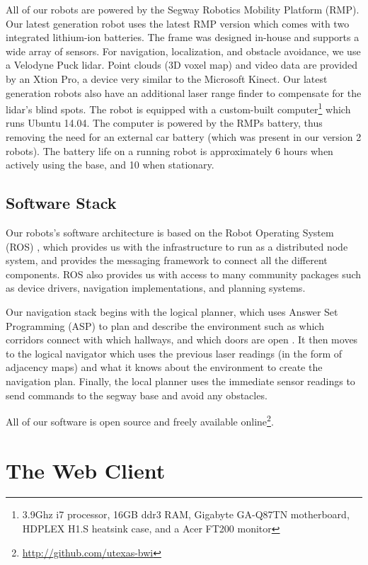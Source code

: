 \documentclass[
  oneside,
  11pt, a4paper,
  footinclude=true,
  headinclude=true,
  cleardoublepage=empty
]{article}
\begin{document}
All of our robots are powered by the Segway Robotics Mobility Platform (RMP).
Our latest generation robot uses the latest RMP version which comes with
two integrated lithium-ion batteries. The frame was designed in-house and
supports a wide array of sensors. For navigation, localization, and obstacle
avoidance, we use a Velodyne Puck lidar. Point clouds (3D voxel map) and video
data are provided by an Xtion Pro, a device very similar to the Microsoft
Kinect. Our latest generation robots also have an additional laser range finder
to compensate for the lidar's blind spots. The robot is equipped with a
custom-built computer\footnote{3.9Ghz i7 processor, 16GB ddr3 RAM, Gigabyte
GA-Q87TN motherboard, HDPLEX H1.S heatsink case, and a Acer FT200 monitor}
which runs Ubuntu 14.04. The computer is powered by the RMPs battery, thus
removing the need for an external car battery (which was present in our version
2 robots).  The battery life on a running robot is approximately 6 hours when
actively using the base, and 10 when stationary.

\subsection{Software Stack}

Our robots's software architecture is based on the Robot Operating System (ROS)
\citep{quigley2009}, which provides us with the infrastructure to run as a
distributed node system, and provides the messaging framework to connect all
the different components. ROS also provides us with access to many community
packages such as device drivers, navigation implementations, and planning
systems.

Our navigation stack begins with the logical planner, which uses Answer Set
Programming (ASP) to plan and describe the environment such as which corridors
connect with which hallways, and which doors are open \citep{lifschitz2008}. It
then moves to the logical navigator which uses the previous laser readings (in
the form of adjacency maps) and what it knows about the environment to create
the navigation plan. Finally, the local planner uses the immediate sensor
readings to send commands to the segway base and avoid any obstacles.

All of our software is open source and freely available
online\footnote{\url{http://github.com/utexas-bwi}}.

\section{The Web Client}\label{sec:client}
\end{document}
